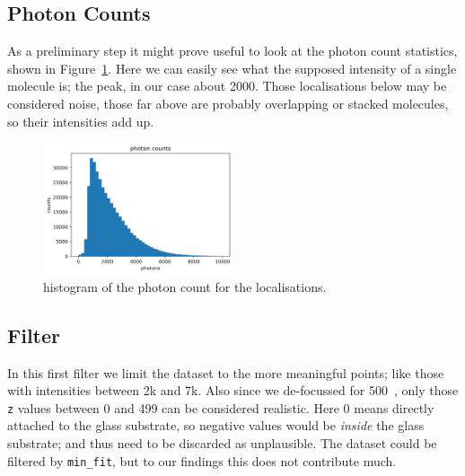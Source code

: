 \documentclass[11pt, a4paper, oneside, twocolumn]{report}
\renewcommand{\tt}{\texttt}
\newcommand{\e}{\emph}
\newcommand{\n}{\textnormal}
\newcommand{\m}{\mathrm}
\begin{document}
\subsection{Photon Counts}

As a preliminary step it might prove useful to look at the photon
count statistics, shown in Figure~\ref{f:3_photons}. Here we can easily
see what the supposed intensity of a single molecule is; the peak, in
our case about 2000. Those localisations below may be considered
noise, those far above are probably overlapping or stacked molecules,
so their intensities add up.

  

\begin{figure}[h!]
  \centering
  \includegraphics[width=0.5\textwidth]{3_photons.png}
  \caption{histogram of the photon count for the localisations.}
  \label{f:3_photons}
\end{figure}


\subsection{Filter}

In this first filter we limit the dataset to the more meaningful
points; like those with intensities between 2k and 7k. Also since we
de-focussed for \SI{500}{\n\m}, only those \tt{z} values between 0 and 499 can
be considered realistic. Here 0 means directly attached to the glass
substrate, so negative values would be \e{inside} the glass substrate;
and thus need to be discarded as unplausible. The dataset could be
filtered by \tt{min\_fit}, but to our findings this does not contribute
much.
\end{document}
